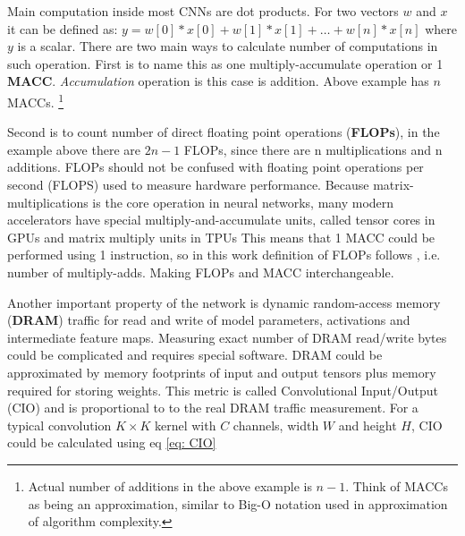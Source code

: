 Main computation inside most CNNs are dot products. For two vectors $w$ and $x$ it can be defined as: $y = w[0]*x[0] + w[1]*x[1] + \ldots + w[n] * x[n]$ where $y$ is a scalar.
There are two main ways to calculate number of computations in such operation. First is to name this as one multiply-accumulate operation or 1 \textbf{MACC}. \textit{Accumulation} operation is this case is addition. Above example has $n$ MACCs. \footnote{Actual number of additions in the above example is $n - 1$. Think of MACCs as being an approximation, similar to Big-O notation used in approximation of algorithm complexity.}



Second is to count number of direct floating point operations (\textbf{FLOPs}), in the example above there are $2n - 1$ FLOPs, since there are n multiplications and n additions. FLOPs should not be confused with floating point operations per second (FLOPS) used to measure hardware performance. Because matrix-multiplications is the core operation in neural networks, many modern accelerators have special multiply-and-accumulate units, called tensor cores 
in GPUs and matrix multiply units in TPUs %
This means that 1 MACC could be performed using 1 instruction, so in this work definition of FLOPs follows \cite{zhang2018_shufflenet}, i.e. number of multiply-adds. Making FLOPs and MACC interchangeable.

Another important property of the network is dynamic random-access memory (\textbf{DRAM}) traffic for read and write of model parameters, activations and intermediate feature maps. Measuring exact number of DRAM read/write bytes could be complicated and requires special software. DRAM could be approximated by memory footprints of input and output tensors plus memory required for storing weights. This metric is called Convolutional Input/Output (CIO) \cite{chao2019_hardnet} and is proportional to to the real DRAM traffic measurement. For a typical convolution $K \times K$ kernel with $C$ channels, width $W$ and height $H$, CIO could be calculated using eq \ref{eq: CIO}

